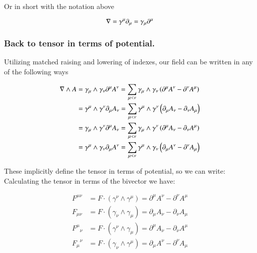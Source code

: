 Or in short with the notation above

\begin{equation*}
\nabla = \gamma^{\mu} \partial_{\mu} = \gamma_{\mu} \partial^{\mu}
\end{equation*}

\subsubsection{Back to tensor in terms of potential. }
Utilizing matched raising and lowering of indexes, our field can be written in any of the following ways

\begin{align*}
\nabla \wedge A
&= {\gamma_{\mu}} \wedge \gamma_{\nu} \partial^{\mu} A^{\nu} = \sum_{\mu<\nu} {\gamma_{\mu}} \wedge \gamma_{\nu} \left( \partial^{\mu} A^{\nu} - \partial^{\nu} A^{\mu} \right) \\
&= {\gamma^{\mu}} \wedge \gamma^{\nu} \partial_{\mu} A_{\nu} = \sum_{\mu<\nu} {\gamma^{\mu}} \wedge \gamma^{\nu} \left( \partial_{\mu} A_{\nu} - \partial_{\nu} A_{\mu} \right) \\
&= {\gamma_{\mu}} \wedge \gamma^{\nu} \partial^{\mu} A_{\nu} = \sum_{\mu<\nu} {\gamma_{\mu}} \wedge \gamma^{\nu} \left( \partial^{\mu} A_{\nu} - \partial_{\nu} A^{\mu} \right) \\
&= {\gamma^{\mu}} \wedge \gamma_{\nu} \partial_{\mu} A^{\nu} = \sum_{\mu<\nu} {\gamma^{\mu}} \wedge \gamma_{\nu} \left( \partial_{\mu} A^{\nu} - \partial^{\nu} A_{\mu} \right) \\
\end{align*}

These implicitly define the tensor in terms of potential, so we can write:
Calculating the tensor in terms of the bivector we have:

\begin{align}\label{eqn:maxToTensor:tensorpot}
F^{\mu\nu} &= F \cdot (\gamma^{\nu} \wedge \gamma^{\mu}) = \partial^{\mu} A^{\nu} - \partial^{\nu} A^{\mu} \\
F_{\mu\nu} &= F \cdot (\gamma_{\nu} \wedge \gamma_{\mu}) = \partial_{\mu} A_{\nu} - \partial_{\nu} A_{\mu} \\
{F^{\mu}}_{\nu} &= F \cdot (\gamma^{\nu} \wedge \gamma_{\mu}) = \partial^{\mu} A_{\nu} - \partial_{\nu} A^{\mu} \\
{F_{\mu}}^{\nu} &= F \cdot (\gamma_{\nu} \wedge \gamma^{\mu}) = \partial_{\mu} A^{\nu} - \partial^{\nu} A_{\mu}
\end{align}

